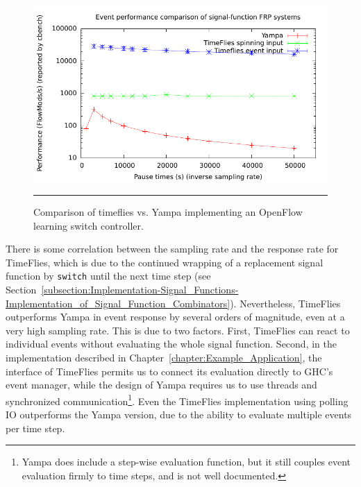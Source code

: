 \begin{figure}
\includegraphics{graph}
\hrule
\caption{Comparison of timeflies vs. Yampa implementing an OpenFlow learning switch controller.}
\label{fig:timeflies-yampa-comparison}
\end{figure}

There is some correlation between the sampling rate and the response rate
for TimeFlies, which is due to the continued wrapping of a replacement signal
function by {\tt switch} until the next time step (see Section~\ref{subsection:Implementation-Signal_Functions-Implementation_of_Signal_Function_Combinators}).
Nevertheless, TimeFlies outperforms Yampa in event response by several orders of magnitude,
even at a very high sampling rate. This is due to two factors. First, TimeFlies can react
to individual events without evaluating the whole signal function. Second, in
the implementation described in Chapter~\ref{chapter:Example_Application}, the
interface of TimeFlies permits us to connect its evaluation directly to GHC's
event manager, while the design of Yampa requires us to use threads and
synchronized communication\footnote{Yampa does include a step-wise evaluation
function, but it still couples event evaluation firmly to time steps, and is not well
documented.}. Even the TimeFlies implementation using polling IO outperforms the
Yampa version, due to the ability to evaluate multiple events per time step.

